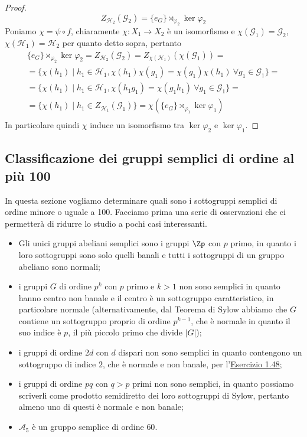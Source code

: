 \documentclass[11pt]{scrartcl}
\begin{document}
\begin{proof}
    \[
        Z_{\mathcal{H}_2}(\mathcal{G}_2) = \{e_G\}\rtimes_{\varphi_2}\ker\varphi_2
    \]
    Poniamo $\chi = \psi\circ f$, chiaramente $\chi: X_1\longrightarrow X_2$
    è un isomorfismo e $\chi(\mathcal{G}_1) = \mathcal{G}_2$, $\chi(\mathcal{H}_1)
    = \mathcal{H}_2$ per quanto detto sopra, pertanto
    \begin{multline*}
        \{e_G\}\rtimes_{\varphi_2}\ker\varphi_2 = Z_{\mathcal{H}_2}(\mathcal{G}_2) =
        Z_{\chi(\mathcal{H}_1)}(\chi(\mathcal{G}_1)) = \\
        = \{\chi(h_1) \mid h_1 \in \mathcal{H}_1, \chi(h_1)\chi(g_1) = 
        \chi(g_1)\chi(h_1)~\forall g_1 \in \mathcal{G}_1\} = \\
        = \{\chi(h_1)\mid h_1 \in \mathcal{H}_1, \chi(h_1g_1) = \chi(g_1h_1)
        ~\forall g_1 \in \mathcal{G}_1\} = \\
        = \{\chi(h_1) \mid h_1 \in Z_{\mathcal{H}_1}(\mathcal{G}_1)\} = 
        \chi(\{e_G\}\rtimes_{\varphi_1}\ker\varphi_1)\\
    \end{multline*}
    In particolare quindi $\chi$ induce un isomorfismo tra $\ker\varphi_2$ e 
    $\ker\varphi_1$.
\end{proof}

\newpage

\subsection{Classificazione dei gruppi semplici di ordine al più 100}

In questa sezione vogliamo determinare quali sono i sottogruppi semplici di 
ordine minore o uguale a 100. Facciamo prima una serie di osservazioni che 
ci permetterà di ridurre lo studio a pochi casi interessanti.

\begin{itemize}
    \item Gli unici gruppi abeliani semplici sono i gruppi $\Zp$ con $p$ primo,
    in quanto i loro sottogruppi sono solo quelli banali e tutti i sottogruppi
    di un gruppo abeliano sono normali;
    \item i gruppi $G$ di ordine $p^k$ con $p$ primo e $k > 1$ non sono semplici
    in quanto hanno centro non banale e il centro è un sottogruppo caratteristico,
    in particolare normale (alternativamente, dal Teorema di Sylow abbiamo che 
    $G$ contiene un sottogruppo proprio di ordine $p^{k - 1}$, che è normale in quanto
    il suo indice è $p$, il più piccolo primo che divide $|G|$);
    \item i gruppi di ordine $2d$ con $d$ dispari non sono semplici in quanto
    contengono un sottogruppo di indice $2$, che è normale e non banale, per 
    l'\hyperref[ex1.48]{Esercizio 1.48};
    \item i gruppi di ordine $pq$ con $q > p$ primi non sono semplici, in
    quanto possiamo scriverli come prodotto semidiretto dei loro sottogruppi
    di Sylow, pertanto almeno uno di questi è normale e non banale;
    \item $\mathcal{A}_5$ è un gruppo semplice di ordine $60$.
\end{itemize}
\end{document}
